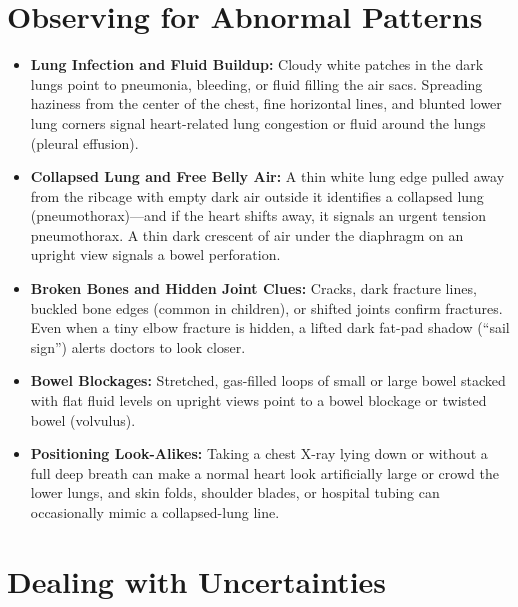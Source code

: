 \section{Observing for Abnormal Patterns}

\begin{itemize}
    \item \textbf{Lung Infection and Fluid Buildup:} Cloudy white patches in the dark lungs point to pneumonia, bleeding, or fluid filling the air sacs. Spreading haziness from the center of the chest, fine horizontal lines, and blunted lower lung corners signal heart-related lung congestion or fluid around the lungs (pleural effusion).
    \item \textbf{Collapsed Lung and Free Belly Air:} A thin white lung edge pulled away from the ribcage with empty dark air outside it identifies a collapsed lung (pneumothorax)---and if the heart shifts away, it signals an urgent tension pneumothorax. A thin dark crescent of air under the diaphragm on an upright view signals a bowel perforation.
    \item \textbf{Broken Bones and Hidden Joint Clues:} Cracks, dark fracture lines, buckled bone edges (common in children), or shifted joints confirm fractures. Even when a tiny elbow fracture is hidden, a lifted dark fat-pad shadow (``sail sign'') alerts doctors to look closer.
    \item \textbf{Bowel Blockages:} Stretched, gas-filled loops of small or large bowel stacked with flat fluid levels on upright views point to a bowel blockage or twisted bowel (volvulus).
    \item \textbf{Positioning Look-Alikes:} Taking a chest X-ray lying down or without a full deep breath can make a normal heart look artificially large or crowd the lower lungs, and skin folds, shoulder blades, or hospital tubing can occasionally mimic a collapsed-lung line.
\end{itemize}

\section{Dealing with Uncertainties}


